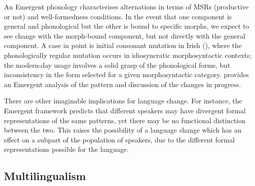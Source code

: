 An Emergent phonology characterises alternations in terms of MSRs (productive or not) and well-formedness conditions. In the event that one component is general and phonological but the other  is bound to specific morphs, we expect to see change with the morph-bound component, but not directly with the general component. A case in point is  initial consonant mutation in Irish (\citealt{McCullough:2020}), where the phonologically regular mutation occurs in idiosyncratic morphosyntactic contexts; the modern-day usage involves a solid grasp of the phonological forms, but inconsistency in the form selected for a given morphosyntactic category. \citet{McCullough:2020} provides an Emergent analysis of the pattern and discussion of the changes in progress.

There are other imaginable implications for language change. For instance, the Emergent framework predicts that different speakers may have divergent formal representations of the same patterns, yet there may be no functional distinction between the two. This raises the possibility of a language change which has an effect on a subpart of the population of speakers, due to the different formal representations possible for the language.


\subsection{Multilingualism}

